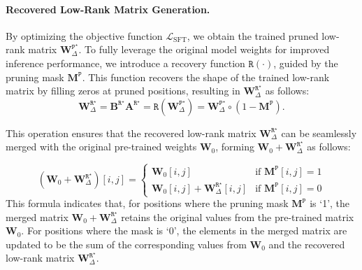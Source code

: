 \paragraph{Recovered Low-Rank Matrix Generation.}
By optimizing the objective function $\mathcal{L}_\text{SFT}$, we obtain the trained pruned low-rank matrix $\mathbf{W}_{\Delta}^{\mathtt{P}^{\star}}$.
To fully leverage the original model weights for improved inference performance, we introduce a recovery function $\mathtt{R}(\cdot)$, guided by the pruning mask $\mathbf{M}^\mathtt{P}$.
This function recovers the shape of the trained low-rank matrix by filling zeros at pruned positions, resulting in $\mathbf{W}_{\Delta}^{\mathtt{R}^{\star}}$ as follows:
\begin{equation}
\mathbf{W}_{\Delta}^{\mathtt{R}^{\star}} = 
\mathbf{B}^{\mathtt{R}^{\star}}\mathbf{A}^{\mathtt{R}^{\star}} =
\mathtt{R}(\mathbf{W}_{\Delta}^{\mathtt{P}^{\star}})=
\mathbf{W}_{\Delta}^{\mathtt{P}^{\star}} \circ (1 - \mathbf{M}^\mathtt{P}).
\end{equation}

This operation ensures that the recovered low-rank matrix $\mathbf{W}_{\Delta}^{\mathtt{R}^{\star}}$ can be seamlessly merged with the original pre-trained weights $\mathbf{W}_{0}$, forming $\mathbf{W}_{0} + \mathbf{W}_{\Delta}^{\mathtt{R}^{\star}}$ as follows:

\begin{equation}
(\mathbf{W}_{0} + \mathbf{W}_{\Delta}^{\mathtt{R}^{\star}})[i, j] = 
\begin{cases}
\mathbf{W}_{0}[i, j] & \text{if } \mathbf{M}^\mathtt{P}[i, j] = 1 \\
\mathbf{W}_{0}[i, j] +\mathbf{W}_{\Delta}^{\mathtt{R}^{\star}}[i, j] & \text{if } \mathbf{M}^\mathtt{P}[i, j] = 0
\end{cases}
\end{equation}
This formula indicates that, for positions where the pruning mask $\mathbf{M}^\mathtt{P}$ is `1', the merged matrix $\mathbf{W}_{0} + \mathbf{W}_{\Delta}^{\mathtt{R}^{\star}}$ retains the original values from the pre-trained matrix $\mathbf{W}_{0}$. For positions where the mask is `0', the elements in the merged matrix are updated to be the sum of the corresponding values from $\mathbf{W}_{0}$ and the recovered low-rank matrix $\mathbf{W}_{\Delta}^{\mathtt{R}^{\star}}$.


